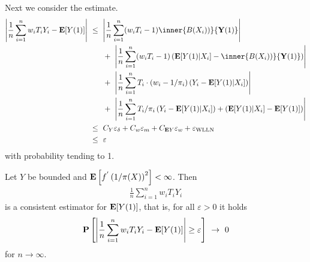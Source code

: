  Next we consider the estimate.
\begin{align*}
  \left| 
    \frac{1}{n}
    \sum_{i=1}^{n} 
    w_i
    T_i
    Y_i
    -
    \E[Y(1)]
  \right|
  &
  \ 
  \le
  \ 
  \left|  
  \frac{1}{n}
    \sum_{i=1}^{n} 
    (
    w_i T_i
    -
    1
    )
    \inner
    {B(X_i))}
    { \mathbf{Y}(1) }
  \right|
  \\
  &
  \qquad
  +
  \ 
  \left|  
  \frac{1}{n}
    \sum_{i=1}^{n} 
    (
    w_i T_i
    -
    1
    )
    \left( 
    \E[Y(1)| X_i]
    -
    \inner
    {B(X_i))}
    { \mathbf{Y}(1) }
    \right)
  \right|
  \\
  &
  \qquad
  +
  \ 
  \left|  
  \frac{1}{n}
    \sum_{i=1}^{n} 
    T_i
    \cdot
    (
    w_i 
    -
    1/\pi_i
    )
    \left( 
      Y_i
    -
    \E[Y(1)| X_i]
    \right)
  \right|
  \\
  &
  \qquad
  +
  \ 
  \left|  
  \frac{1}{n}
    \sum_{i=1}^{n} 
    T_i
    /\pi_i
    \left( 
      Y_i
    -
    \E[Y(1)| X_i]
    \right)
    +
    \left( 
    \E[Y(1)| X_i]
    -
    \E[Y(1)]
    \right)
  \right|
  \\
  &
  \ 
  \le
  \ 
  C_Y
  \varepsilon _ \delta
  +
  C_w
  \varepsilon _ m
  +
  C_{\E Y}
  \varepsilon _ w
  +
  \varepsilon _ {\mathrm{WLLN}}
  \\
  &
  \ 
  \le
  \ 
  \varepsilon
\end{align*}
with probability tending to 1.
\begin{ftheorem}
  Let 
  $Y$
  be bounded
  and 
  $
    \mathbf{E}
    \left[ 
      f ^ { ' }
\left( 
  1 / \pi(X)
\right)
^2
    \right]
    <
    \infty
  $.
  Then 
  \begin{gather*}
    \frac{1}{n}
    \sum_{i=1}^{n} 
    w_i
    T_i
    Y_i
  \end{gather*}
  is a consistent estimator for $\mathbf{E}[Y(1)]$,
  that is, for all 
  $
    \varepsilon > 0
  $
  it holds
  \begin{gather*}
    \P
    \left[ 
      \left| 
    \frac{1}{n}
    \sum_{i=1}^{n} 
    w_i
    T_i
    Y_i
    -
    \E[Y(1)]
      \right|
    \ge 
    \varepsilon
    \right]
    \ 
    \to
    \ 
    0
  \end{gather*}
  for 
  $n\to \infty$.
\end{ftheorem}
